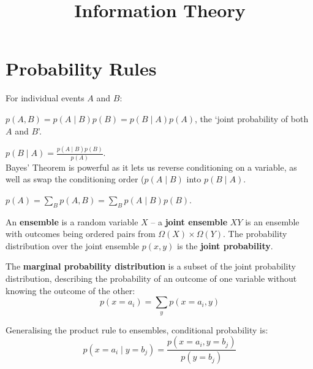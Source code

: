 \documentclass[a4paper, 11pt]{article}
\title{\vspace{-2cm}Information Theory\vspace{-2cm}}
\author{}
\date{}
\begin{document}
\maketitle

\section*{Probability Rules}
{
    For individual events \(A\) and \(B\):
    \begin{description}
    \setlength{\itemsep}{3mm}
    \item[Product Rule:] \(\displaystyle p(A,B) = p(A \mid B)p(B) = p(B \mid A)p(A)\), the `joint probability of both \(A\) and \(B\)'.
    \item[Bayes' Theorem:] \(\displaystyle p(B  \mid A) = \frac{p(A \mid B)p(B)}{p(A)}\).\\Bayes' Theorem is powerful as it lets us reverse conditioning on a variable, as well as swap the conditioning order (\(p(A \mid B)\) into \(p(B \mid A)\).
    \item[Sum Rule:] \(\displaystyle p(A) = \sum_B{p(A,B)} = \sum_B{p(A \mid B)p(B)}\).
    \end{description}

    An \textbf{ensemble} is a random variable \(X\) -- a \textbf{joint ensemble} \(XY\) is an ensemble with outcomes being ordered pairs from \(\Omega(X) \times \Omega(Y)\). The probability distribution over the joint ensemble \(p(x,y)\) is the \textbf{joint probability}.

    The \textbf{marginal probability distribution} is a subset of the joint probability distribution, describing the probability of an outcome of one variable without knowing the outcome of the other:
    \[p(x=a_i) = \sum_y{p(x=a_i,y)}\]

    Generalising the product rule to ensembles, conditional probability is:
    \[p(x=a_i \mid y=b_j) = \frac{p(x=a_i,y=b_j)}{p(y=b_j)}\]
}
\end{document}
